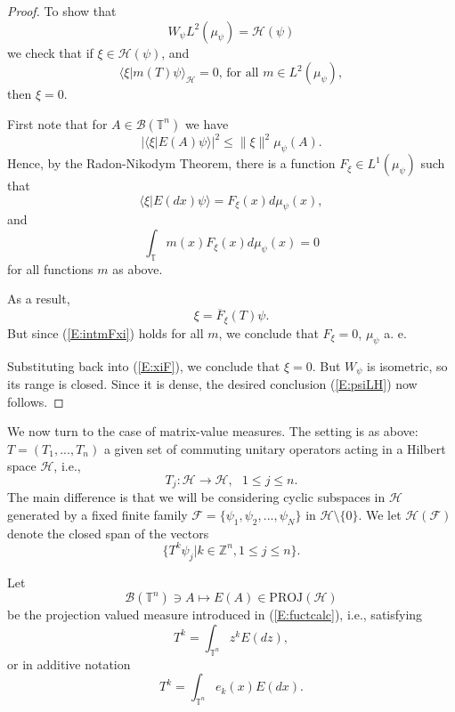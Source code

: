 \documentclass{birkmult}
\theoremstyle{definition}
\theoremstyle{remark}
\numberwithin{equation}{section}
\begin{document}
\begin{proof}
To show that
\begin{equation}
\label{E:psiLH}
  W_{\psi}L^{2}(\mu_{\psi})= \mathcal{H}(\psi)
\end{equation}
we check that if $\xi \in \mathcal{H}(\psi)$, and 
\begin{equation}
\label{E:ximT}
  \langle \xi | m(T)\psi \rangle_{\mathcal{H}} = 0 \text{, for all } m \in 
  L^{2}(\mu_{\psi}),
\end{equation}
then $\xi =0$.

First note that for $A \in \mathcal{B}(\mathbb{T}^{n})$ we have 
\[
  |\langle \xi | E(A)\psi \rangle|^{2} \leq \|\xi\|^{2}\mu_{\psi}(A).
\]
Hence, by the Radon-Nikodym Theorem, there is a function 
$F_{\xi} \in L^{1}(\mu_{\psi})$ such that
\[
  \langle \xi | E(dx)\psi \rangle = F_{\xi}(x)d\mu_{\psi}(x),
\]
and
\begin{equation}
\label{E:intmFxi}
  \int_{\mathbb{T}}m(x)F_{\xi}(x)d\mu_{\psi}(x)=0
\end{equation}
for all functions $m$ as above.

As a result, 
\begin{equation}
\label{E:xiF}
  \xi = \overline{F}_{\xi}(T)\psi.
\end{equation}
But since (\ref{E:intmFxi}) holds for all $m$, we conclude that $F_{\xi}=0$,
$\mu_{\psi}$ a. e.

Substituting back into (\ref{E:xiF}), we conclude that $\xi=0$.  But 
$W_{\psi}$ is isometric, so its range is closed.  Since it is dense, the
desired conclusion (\ref{E:psiLH}) now follows.
\end{proof}

We now turn to the case of matrix-value measures.  The setting is as above:
$T=(T_{1}, ..., T_{n})$ a given set of commuting unitary operators acting
in a Hilbert space $\mathcal{H}$, i.e., 
\begin{equation}
\label{E:Tj}
  T_{j}:\mathcal{H} \to \mathcal{H}, \text{ } 1\leq j \leq n.
\end{equation}
The main difference is that we will be considering cyclic subspaces in 
$\mathcal{H}$ generated by a fixed finite family 
$\mathcal{F} = \{\psi_{1}, \psi_{2}, ..., \psi_{N}\}$ in 
$\mathcal{H} \setminus \{0\}$.  We let $\mathcal{H}(\mathcal{F})$ denote the 
closed span of the vectors
\begin{equation}
\label{E:setT}
  \{T^{k}\psi_{j}|k\in \mathbb{Z}^{n}, 1 \leq j \leq n\}.
\end{equation}

Let
\[
  \mathcal{B}(\mathbb{T}^{n}) \ni A \mapsto E(A) \in \text{PROJ}(\mathcal{H})
\]
be the projection valued measure introduced in (\ref{E:fuctcalc}), i.e.,
satisfying
\begin{equation}
\label{E:TintzkE}
  T^{k} = \int_{\mathbb{T}^{n}}z^{k}E(dz),
\end{equation}
or in additive notation
\begin{equation}
\label{E:TintekE}
  T^{k} = \int_{\mathbb{T}^{n}}e_{k}(x)E(dx).
\end{equation}
\end{document}
